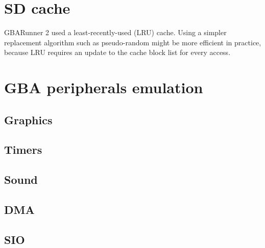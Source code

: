 \documentclass[a4paper,10pt]{report}
\begin{document}
\chapter{SD cache}
	GBARunner 2 used a least-recently-used (LRU) cache. Using a simpler replacement algorithm such as pseudo-random might be more efficient in practice, because LRU requires an update to the cache block list for every access.
\chapter{GBA peripherals emulation}
	\section{Graphics}
	\section{Timers}
	\section{Sound}
	\section{DMA}
	\section{SIO}
	
\clearpage
{
	\raggedright
	\printbibliography
}
\end{document}
